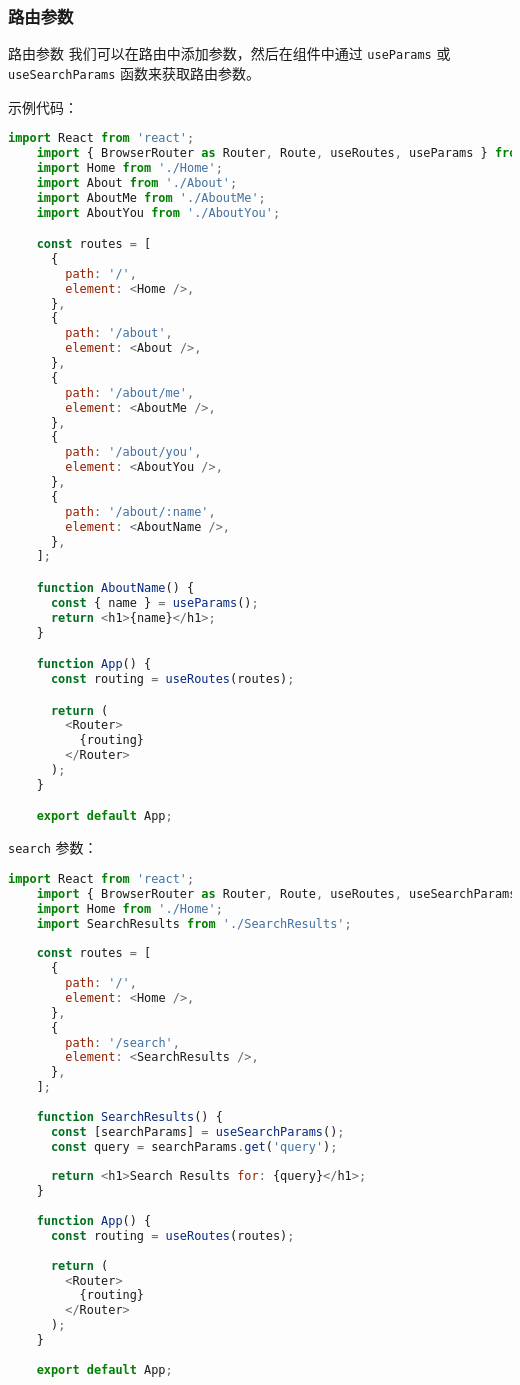 \documentclass{beamer}
\begin{document}
\begin{frame}
  \frametitle{路由参数}

  \begin{block}{路由参数}
    我们可以在路由中添加参数，然后在组件中通过 \texttt{useParams} 或 \texttt{useSearchParams} 函数来获取路由参数。
  \end{block}

  示例代码：

  \begin{lstlisting}[language=JavaScript]
    import React from 'react';
    import { BrowserRouter as Router, Route, useRoutes, useParams } from 'react-router-dom';
    import Home from './Home';
    import About from './About';
    import AboutMe from './AboutMe';
    import AboutYou from './AboutYou';

    const routes = [
      {
        path: '/',
        element: <Home />,
      },
      {
        path: '/about',
        element: <About />,
      },
      {
        path: '/about/me',
        element: <AboutMe />,
      },
      {
        path: '/about/you',
        element: <AboutYou />,
      },
      {
        path: '/about/:name',
        element: <AboutName />,
      },
    ];

    function AboutName() {
      const { name } = useParams();
      return <h1>{name}</h1>;
    }

    function App() {
      const routing = useRoutes(routes);

      return (
        <Router>
          {routing}
        </Router>
      );
    }

    export default App;
  \end{lstlisting}

  \texttt{search} 参数：

  \begin{lstlisting}[language=JavaScript]
    import React from 'react';
    import { BrowserRouter as Router, Route, useRoutes, useSearchParams } from 'react-router-dom';
    import Home from './Home';
    import SearchResults from './SearchResults';
    
    const routes = [
      {
        path: '/',
        element: <Home />,
      },
      {
        path: '/search',
        element: <SearchResults />,
      },
    ];
    
    function SearchResults() {
      const [searchParams] = useSearchParams();
      const query = searchParams.get('query');
    
      return <h1>Search Results for: {query}</h1>;
    }
    
    function App() {
      const routing = useRoutes(routes);
    
      return (
        <Router>
          {routing}
        </Router>
      );
    }
    
    export default App;
\end{lstlisting}

\end{frame}
\end{document}
